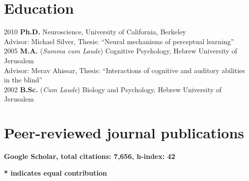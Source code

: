 \documentclass[11pt,fullpage]{article}
\begin{document}
\section*{Education}

	2010  {\bf Ph.D. } Neuroscience, University of California, Berkeley \\
  \hspace{\parindent} Advisor: Michael Silver, Thesis: ``Neural mechanisms of perceptual learning''\\
	2005  {\bf M.A.} (\emph{Summa cum Laude}) Cognitive Psychology, Hebrew University of Jerusalem \\
  \hspace{\parindent} Advisor: Merav Ahissar, Thesis: ``Interactions of cognitive and auditory abilities in the blind'' \\
	2002  {\bf B.Sc.} (\emph{Cum Laude}) Biology and Psychology, Hebrew University of Jerusalem \\

\section*{Peer-reviewed journal publications}

\textbf{Google Scholar, total citations: 7,656, h-index: 42}

\textbf{* indicates equal contribution}
\end{document}
